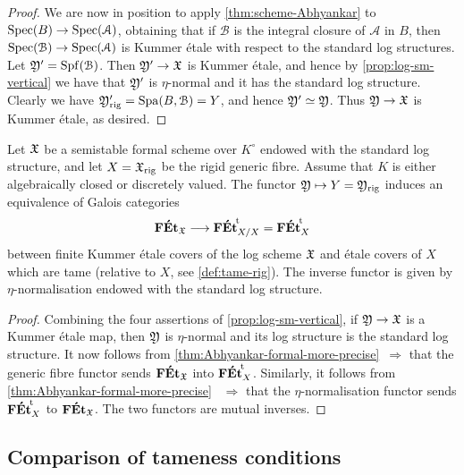\begin{proof}
We are now in position to apply \cref{thm:scheme-Abhyankar} to $\operatorname{Spec}(B) \to \operatorname{Spec}(\mathcal{A})$, obtaining that if $\mathcal{B}$ is the integral closure of $\mathcal{A}$ in $B$, then $\operatorname{Spec}(\mathcal{B})\to\operatorname{Spec}(\mathcal{A})$ is Kummer \'etale with respect to the standard log structures. Let ${\mathfrak{Y}}' = \operatorname{Spf}(\mathcal{B})$. Then ${\mathfrak{Y}}'\to {\mathfrak{X}}$ is Kummer \'etale, and hence by \cref{prop:log-sm-vertical} we have that ${\mathfrak{Y}}'$ is $\eta$-normal and it has the standard log structure. Clearly we have ${\mathfrak{Y}}'_{\rm rig} = \operatorname{Spa}(B, \mathcal{B}) = Y$, and hence ${\mathfrak{Y}}'\simeq {\mathfrak{Y}}$. Thus ${\mathfrak{Y}}\to {\mathfrak{X}}$ is Kummer \'etale, as desired.
\end{proof}

\begin{cor}
\label{cor:generic fibre and eta normalisation}
    Let ${\mathfrak{X}}$ be a semistable formal scheme over $K^\circ$ endowed with the standard log structure, and let $X={\mathfrak{X}}_{{\rm rig}}$ be the rigid generic fibre.  Assume that $K$ is either algebraically closed or discretely valued. 
    The functor ${\mathfrak{Y}} \mapsto Y = {\mathfrak{Y}}_{\rm rig}$ induces an equivalence of Galois categories
    \[
    \mathbf{F\acute{E}t}_{\mathfrak{X}} \longrightarrow {\mathbf{F\acute{E}t}}^{\!\mathrm{t}}_{X/X} ={\mathbf{F\acute{E}t}}^{\!\mathrm{t}}_X
    \]
    between finite Kummer \'etale covers of the log scheme ${\mathfrak{X}}$ and \'etale covers of $X$ which are tame (relative to $X$, see \cref{def:tame-rig}).
    The inverse functor is given by $\eta$-normalisation endowed with the standard log structure.
\end{cor}

\begin{proof}
Combining the four assertions of \cref{prop:log-sm-vertical},
if ${\mathfrak{Y}}\to {\mathfrak{X}}$ is a Kummer \'etale map, then ${\mathfrak{Y}}$ is $\eta$-normal and its log structure is the standard log structure. It now follows from \cref{thm:Abhyankar-formal-more-precise}~$\Rightarrow$ that the generic fibre functor sends $\mathbf{F\acute{E}t}_{\mathfrak{X}}$ into ${\mathbf{F\acute{E}t}}^{\!\mathrm{t}}_{X}$.  Similarly, it follows from \cref{thm:Abhyankar-formal-more-precise}~ $\Rightarrow$ that the $\eta$-normalisation functor sends ${\mathbf{F\acute{E}t}}^{\!\mathrm{t}}_{X}$ to $\mathbf{F\acute{E}t}_{\mathfrak{X}}$. The two functors are mutual inverses. 
\end{proof}


\subsection{Comparison of tameness conditions}
\label{ss:tameness-comparison-pre}

